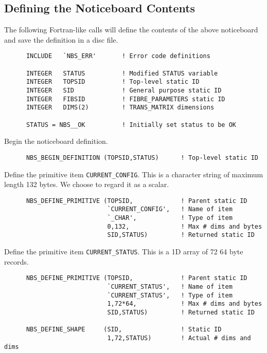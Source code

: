 \subsection {Defining the Noticeboard Contents}

The following Fortran-like calls will define the contents of the above
noticeboard and save the definition in a disc file.

\begin {verbatim}
      INCLUDE   `NBS_ERR'       ! Error code definitions

      INTEGER   STATUS          ! Modified STATUS variable
      INTEGER   TOPSID          ! Top-level static ID
      INTEGER   SID             ! General purpose static ID
      INTEGER   FIBSID          ! FIBRE_PARAMETERS static ID
      INTEGER   DIMS(2)         ! TRANS_MATRIX dimensions

      STATUS = NBS__OK          ! Initially set status to be OK
\end{verbatim}

Begin the noticeboard definition.

\begin {verbatim}
      NBS_BEGIN_DEFINITION (TOPSID,STATUS)      ! Top-level static ID
\end{verbatim}

Define the primitive item {\tt CURRENT\_CONFIG}. This is a character string
of maximum length 132 bytes. We choose to regard it as a scalar.

\begin {verbatim}
      NBS_DEFINE_PRIMITIVE (TOPSID,             ! Parent static ID
                            `CURRENT_CONFIG',   ! Name of item
                            `_CHAR',            ! Type of item
                            0,132,              ! Max # dims and bytes
                            SID,STATUS)         ! Returned static ID
\end{verbatim}

Define the primitive item {\tt CURRENT\_STATUS}. This is a 1D array of 72 64
byte records.

\begin {verbatim}
      NBS_DEFINE_PRIMITIVE (TOPSID,             ! Parent static ID
                            `CURRENT_STATUS',   ! Name of item
                            `CURRENT_STATUS',   ! Type of item
                            1,72*64,            ! Max # dims and bytes
                            SID,STATUS)         ! Returned static ID

      NBS_DEFINE_SHAPE     (SID,                ! Static ID
                            1,72,STATUS)        ! Actual # dims and dims
\end{verbatim}

